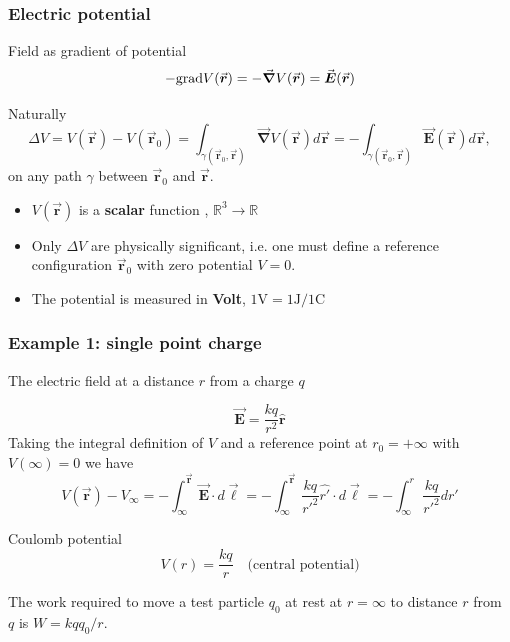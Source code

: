 \documentclass{beamer}
\newcommand{\vc}[1]{\vec{\boldsymbol{#1}}}
\begin{document}
\begin{frame}
\frametitle{Electric potential}
\small

%
%
%
%

\begin{block}{Field as gradient of potential}
\begin{equation}
		-{\rm grad} V(\vc{r}) = -\vc{\nabla}V(\vc{r}) = \vc{E}(\vc{r})
\end{equation}
\end{block}
Naturally \begin{equation}\Delta V = V(\vc{r})-V(\vc{r}_0) =\int_{\gamma(\vc{r}_0, \vc{r})} \vc{\nabla}V(\vc{r})d\vc{r}=-\int_{\gamma(\vc{r}_0, \vc{r})} \vc{E}(\vc{r})d\vc{r},
\end{equation}
on any path $\gamma$ between $\vc{r}_0$ and $\vc{r}$.


\begin{itemize}
	\item $V(\vc{r})$ is a \textbf{scalar} function , $\mathbb{R}^3\rightarrow\mathbb{R}$
	\item Only $\Delta V$ are physically significant, i.e. one must define a reference configuration $\vc{r}_0$ with zero potential $V=0$. 
	\item The potential is measured in \textbf{Volt}, $\unit{1\volt}= 1\unit{\joule}/1\unit{\coulomb}$
\end{itemize}

\end{frame}





\begin{frame}
\frametitle{Example 1: single point charge}
\small
The electric field at a distance $r$ from a charge $q$ 

$$\vc{E}=\frac{k q}{r^2} \hat{\boldsymbol{r}}$$
Taking the integral definition of $V$ and a reference point at $r_{0}=+\infty$ with $V(\infty)=0$ we have
$$V(\vc{r})-V_{\infty }=-\int_{\infty }^{\vc{r}} 
\vc{E} \cdot d \vc{\ell}=-\int_{\infty }^{\vc{r}}
\frac{k q}{r'^2} \hat{r'} \cdot d \vc{\ell}=-
\int_{\infty }^{r} \frac{k q}{r'^2} d r'
$$
\begin{block}{Coulomb potential}
	\begin{equation}
		V(r) = \dfrac{kq}{r} \quad \text{(central potential)}
	\end{equation}
\end{block}

The work required to move a test particle $q_0$ at rest at $r=\infty$ to distance $r$ from $q$ is {$W=kq q_0/r$}.


\end{frame}
\end{document}
